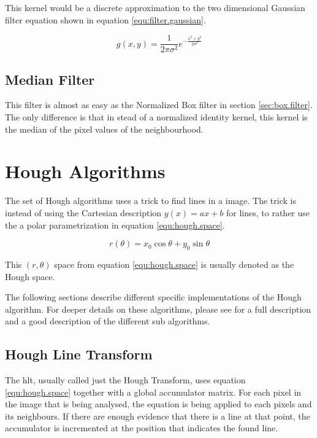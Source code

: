 This kernel would be a discrete approximation to the two dimensional Gaussian filter equation shown in equation \eqref{equ:filter.gaussian}.

\begin{equation}\label{equ:filter.gaussian}
	g(x,y) = \frac{1}{2 \pi \sigma^2}e^{-\frac{x^2 + y^2}{2 \sigma^2}}
\end{equation}

\subsection{Median Filter}\label{sec:median.filter}
This filter is almost as easy as the Normalized Box filter in section \vref{sec:box.filter}. The only difference is that 
in stead of a normalized identity kernel, this kernel is the median of the pixel values of the neighbourhood.

\section{Hough Algorithms}
The set of Hough algorithms uses a trick to find lines in a image. The trick is 
instead of using the Cartesian description $y(x)=ax+b$ for lines, to rather use the 
a polar parametrization in equation \eqref{equ:hough.space}.

\begin{equation}\label{equ:hough.space}
	r(\theta) = x_0\cos \theta + y_0\sin \theta
\end{equation}

This $(r,\theta)$ space from equation \eqref{equ:hough.space}
is usually denoted as the Hough space.

The following sections describe different specific implementations of the Hough algorithm. For 
deeper details on these algorithms, please see \citet{sonka07} for a full description and 
a good description of the different sub algorithms.

\subsection{Hough Line Transform}\label{sec:hough.transform}
The \gls{hlt}, usually called just the Hough Transform, uses equation \eqref{equ:hough.space} together 
with a global accumulator matrix. For each pixel in the image that is being analysed, the equation is being applied 
to each pixels and its neighbours. If there are enough evidence that there is a line at that point, the accumulator 
is incremented at the position that indicates the found line.

